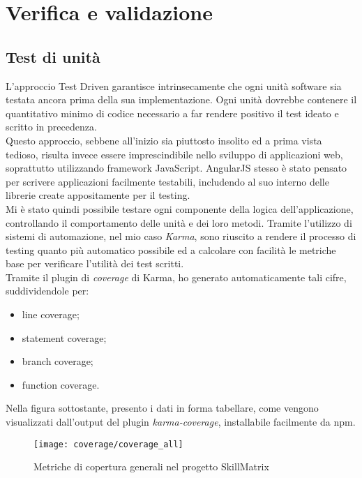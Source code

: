 
\chapter{Verifica e validazione}
\label{cap:verifica-validazione}

\section{Test di unità}
L'approccio Test Driven garantisce intrinsecamente che ogni unità software sia testata ancora prima della sua implementazione. Ogni unità dovrebbe contenere il quantitativo minimo di codice necessario a far rendere positivo il test ideato e scritto in precedenza.\\
Questo approccio, sebbene all'inizio sia piuttosto insolito ed a prima vista tedioso, risulta invece essere imprescindibile nello sviluppo di applicazioni web, soprattutto utilizzando framework JavaScript. AngularJS stesso è stato pensato per scrivere applicazioni facilmente testabili, includendo al suo interno delle librerie create appositamente per il testing.\\
Mi è stato quindi possibile testare ogni componente della logica dell'applicazione, controllando il comportamento delle unità e dei loro metodi. Tramite l'utilizzo di sistemi di automazione, nel mio caso \emph{Karma}, sono riuscito a rendere il processo di testing quanto più automatico possibile ed a calcolare con facilità le metriche base per verificare l'utilità dei test scritti.\\
Tramite il plugin di \emph{coverage} di Karma, ho generato automaticamente tali cifre, suddividendole per:
\begin{itemize}
	\item line coverage;
	\item statement coverage;
	\item branch coverage;
	\item function coverage.
\end{itemize}
Nella figura sottostante, presento i dati in forma tabellare, come vengono visualizzati dall'output del plugin \emph{karma-coverage}, installabile facilmente da \gls{npm}.

\begin{figure}[!h] 
    \centering 
    \texttt{[image: coverage/coverage\_all]} 
    \caption{Metriche di copertura generali nel progetto SkillMatrix}
\end{figure}

